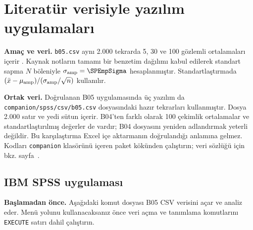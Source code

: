 \section{Literatür verisiyle yazılım uygulamaları}
\label{sec:spss-b05}

\textbf{Amaç ve veri.} \texttt{b05.csv} aynı 2.000 tekrarda 5, 30 ve
100 gözlemli ortalamaları içerir \citep{cortez2008data}.
Kaynak notların tamamı bir benzetim dağılımı kabul edilerek standart sapma
$N$ böleniyle $\sigma_{\rm amp}=\SPEmpSigma$ hesaplanmıştır.
Standartlaştırmada $(\bar x-\mu_{\rm amp})/(\sigma_{\rm amp}/\sqrt n)$ kullanılır.


\textbf{Ortak veri.} Doğrulanan B05 uygulamasında üç yazılım da
\nolinkurl{companion/spss/csv/b05.csv} dosyasındaki hazır tekrarları
kullanmıştır. Dosya 2.000 satır ve yedi sütun içerir. B04'ten farklı
olarak 100 çekimlik ortalamalar ve standartlaştırılmış değerler de vardır;
B04 dosyasını yeniden adlandırmak yeterli değildir. Bu karşılaştırma
Excel içe aktarmanın doğrulandığı anlamına gelmez. Kodları
\texttt{companion} klasörünü içeren paket kökünden çalıştırın;
veri sözlüğü için bkz. sayfa~\pageref{sec:spss-guide}.

\subsection{IBM SPSS uygulaması}
\textbf{Başlamadan önce.} Aşağıdaki komut dosyası B05 CSV verisini
açar ve analiz eder. Menü yolunu kullanacaksanız önce veri açma ve
tanımlama komutlarını \texttt{EXECUTE} satırı dahil çalıştırın.

\begin{spssadimlar}
\end{spssadimlar}

